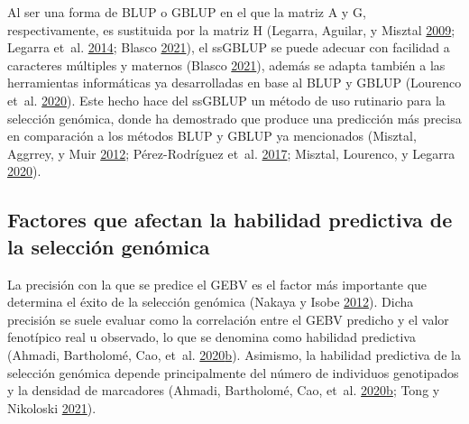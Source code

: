 \documentclass[11pt,spanish,a4paper,oneside,]{book} %
\begin{document}
Al ser una forma de BLUP o GBLUP en el que la matriz A y G, respectivamente, es sustituida por la matriz H (Legarra, Aguilar, y Misztal \protect\hyperlink{ref-cite:17}{2009}; Legarra et~al. \protect\hyperlink{ref-cite:15}{2014}; Blasco \protect\hyperlink{ref-cite:21}{2021}), el ssGBLUP se puede adecuar con facilidad a caracteres múltiples y maternos (Blasco \protect\hyperlink{ref-cite:21}{2021}), además se adapta también a las herramientas informáticas ya desarrolladas en base al BLUP y GBLUP (Lourenco et~al. \protect\hyperlink{ref-cite:22}{2020}). Este hecho hace del ssGBLUP un método de uso rutinario para la selección genómica, donde ha demostrado que produce una predicción más precisa en comparación a los métodos BLUP y GBLUP ya mencionados (Misztal, Aggrrey, y Muir \protect\hyperlink{ref-cite:14}{2012}; Pérez-Rodríguez et~al. \protect\hyperlink{ref-cite:19}{2017}; Misztal, Lourenco, y Legarra \protect\hyperlink{ref-cite:18}{2020}).

\hypertarget{factores-que-afectan-la-habilidad-predictiva-de-la-selecciuxf3n-genuxf3mica}{%
\subsection{Factores que afectan la habilidad predictiva de la selección genómica}\label{factores-que-afectan-la-habilidad-predictiva-de-la-selecciuxf3n-genuxf3mica}}

La precisión con la que se predice el GEBV es el factor más importante que determina el éxito de la selección genómica (Nakaya y Isobe \protect\hyperlink{ref-cite:6}{2012}). Dicha precisión se suele evaluar como la correlación entre el GEBV predicho y el valor fenotípico real u observado, lo que se denomina como habilidad predictiva (Ahmadi, Bartholomé, Cao, et~al. \protect\hyperlink{ref-cite:45}{2020}\protect\hyperlink{ref-cite:45}{b}). Asimismo, la habilidad predictiva de la selección genómica depende principalmente del número de individuos genotipados y la densidad de marcadores (Ahmadi, Bartholomé, Cao, et~al. \protect\hyperlink{ref-cite:45}{2020}\protect\hyperlink{ref-cite:45}{b}; Tong y Nikoloski \protect\hyperlink{ref-cite:7}{2021}).
\end{document}
